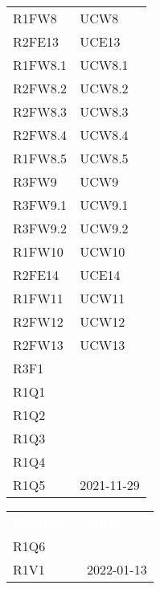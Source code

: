 \begin{table}[!htbp]
\begin{tabular}{ m{}<{\centering}  m{}<{\centering} }
	R1FW8 & UCW8\\		
	
	R2FE13 & UCE13\\	
	 
	R1FW8.1 & UCW8.1\\	
	 
	R2FW8.2 & UCW8.2\\	
	 
	R2FW8.3 & UCW8.3\\	
	 
	R2FW8.4 & UCW8.4\\	 
	 
	R1FW8.5 & UCW8.5\\	 
	 
	R3FW9 & UCW9\\	
	 
	R3FW9.1 & UCW9.1\\	 
	 
	R3FW9.2 & UCW9.2\\	  
	 
	R1FW10 & UCW10 \\	 
	 
	R2FE14 & UCE14\\	 
	 	 
	R1FW11 & UCW11\\	 	 	 	

	R2FW12 & UCW12\\

	R2FW13 & UCW13\\

	R3F1 & \Di \\
	
	R1Q1 & \Di \\
	
	R1Q2 & \Ca \\
	
	R1Q3 & \Ca \\
	
	R1Q4 &  \Ca \\
	
	R1Q5 & \Vi{} 2021-11-29\\
	
\end{tabular}
\begin{tabular}{ m{}<{\centering}  m{}<{\centering} }
	\rowcolor{darkblue}
	\textcolor{white}{\textbf{Requisito}} &\textcolor{white}{\textbf{Fonti}}\\ 

	R1Q6 & \Di \\

	R1V1 & \Vi{} 2022-01-13 \\	


\end{tabular}
\end{table}
